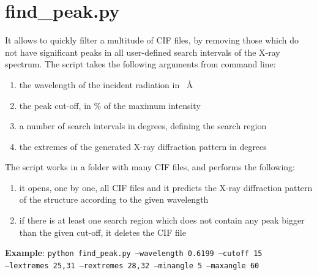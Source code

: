 \documentclass{article}
\begin{document}
\section{find\_peak.py}
It allows to quickly filter a multitude of CIF files, by removing those which do not have significant peaks in all user-defined search intervals of the X-ray spectrum. The script takes the following arguments from command line:
\begin{enumerate}
	\item the wavelength of the incident radiation in \SI{}{\angstrom}
	\item the peak cut-off, in \% of the maximum intensity
	\item a number of search intervals in degrees, defining the search region
	\item the extremes of the generated X-ray diffraction pattern in degrees
\end{enumerate}
The script works in a folder with many CIF files, and performs the following:
\begin{enumerate}
	\item it opens, one by one, all CIF files and it predicts the X-ray diffraction pattern of the structure according to the given wavelength
	\item if there is at least one search region which does not contain any peak bigger than the given cut-off, it deletes the CIF file
\end{enumerate}
\textbf{Example}: \texttt{python find\_peak.py --wavelength 0.6199 --cutoff 15 \\ --lextremes 25,31 --rextremes 28,32 --minangle 5 --maxangle 60}
\end{document}
